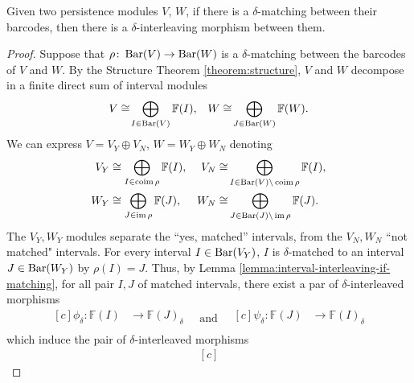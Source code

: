 \begin{proposition}\label{prop:interleaving-if-matching} 
    Given two persistence modules $ V $, $ W $, if there is a $ \delta$-matching between their barcodes, then there is a $ \delta$-interleaving morphism between them.
\end{proposition}
\begin{proof}
    Suppose that $\rho\colon \operatorname{Bar} (V) \to \operatorname{Bar} (W) $ is a $\delta$-matching between the barcodes of $ V $ and $ W $. By the Structure Theorem \ref{theorem:structure}, $ V $ and $ W $ decompose in a finite direct sum of interval modules
    \begin{align}
        V \cong \! \bigoplus_{I \in \operatorname{Bar} (V)} \mathbb F (I),& &W \cong \! \bigoplus_{J \in  \operatorname{Bar} (W)} \mathbb F (W) .
    \end{align}
    We can express $ V = V_Y \oplus V_N $, $ W = W_Y \oplus W_N $ denoting
    \begin{align}
        V_Y &\cong \bigoplus_{I \in  \operatorname{coim} \rho} \mathbb F (I),& V_N \cong &\bigoplus_{I \in \operatorname{Bar}(V) \backslash \operatorname{coim} \rho} \mathbb F (I),\\
        W_Y &\cong \bigoplus_{J \in  \operatorname{im} \rho} \mathbb F (J),& W_N \cong &\bigoplus_{J \in \operatorname{Bar}(J) \backslash \operatorname{im} \rho} \mathbb F (J).
    \end{align}
    The $ V_Y, W_Y $ modules separate the ``yes, matched'' intervals, from the $ V_N, W_N $ ``not matched" intervals. For every interval $ I \in \operatorname{Bar}(V_Y) $, $ I $ is $\delta$-matched to an interval $ J \in \operatorname{Bar}(W_Y)$ by $\rho(I) = J $. Thus, by Lemma \ref{lemma:interval-interleaving-if-matching}, for all pair $ I, J $ of matched intervals, there exist a par of $\delta$-interleaved morphisms
    \begin{equation*}
        \begin{aligned}[c]
        \phi_\delta\colon \mathbb F(I) &\to \mathbb F(J)_\delta\\
        \end{aligned}
        \quad \text{and} \quad
        \begin{aligned}[c]
        \psi_\delta\colon \mathbb F(J) &\to \mathbb F(I)_\delta\\
        \end{aligned}
    \end{equation*}
    which induce the pair of $\delta$-interleaved morphisms
    \begin{equation*}
        \begin{aligned}[c]

\end{aligned}
\end{equation*}
\end{proof}
